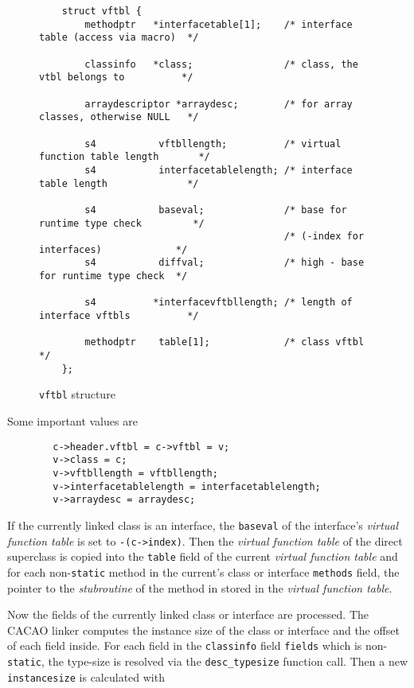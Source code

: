 \begin{figure}
\begin{verbatim}
    struct vftbl {
        methodptr   *interfacetable[1];    /* interface table (access via macro)  */

        classinfo   *class;                /* class, the vtbl belongs to          */

        arraydescriptor *arraydesc;        /* for array classes, otherwise NULL   */

        s4           vftbllength;          /* virtual function table length       */
        s4           interfacetablelength; /* interface table length              */

        s4           baseval;              /* base for runtime type check         */
                                           /* (-index for interfaces)             */
        s4           diffval;              /* high - base for runtime type check  */

        s4          *interfacevftbllength; /* length of interface vftbls          */
	
        methodptr    table[1];             /* class vftbl                         */
    };
\end{verbatim}
\caption{\texttt{vftbl} structure}
\label{vftblstructure}
\end{figure}

Some important values are

\begin{verbatim}
        c->header.vftbl = c->vftbl = v;
        v->class = c;
        v->vftbllength = vftbllength;
        v->interfacetablelength = interfacetablelength;
        v->arraydesc = arraydesc;
\end{verbatim}

If the currently linked class is an interface, the \texttt{baseval} of
the interface's \textit{virtual function table} is set to
\texttt{-(c->index)}. Then the \textit{virtual function table} of the
direct superclass is copied into the \texttt{table} field of the
current \textit{virtual function table} and for each
non-\texttt{static} method in the current's class or interface
\texttt{methods} field, the pointer to the \textit{stubroutine} of the
method in stored in the \textit{virtual function table}.

Now the fields of the currently linked class or interface are
processed. The CACAO linker computes the instance size of the class or
interface and the offset of each field inside. For each field in the
\texttt{classinfo} field \texttt{fields} which is non-\texttt{static},
the type-size is resolved via the \texttt{desc\_typesize} function
call. Then a new \texttt{instancesize} is calculated with

